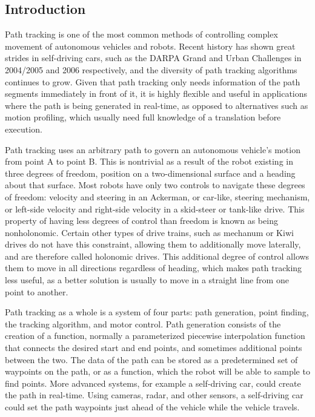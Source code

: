 \documentclass[mla7]{mla}
\begin{document}
\begin{paper}

\section{Introduction}

Path tracking is one of the most common methods of controlling complex movement of autonomous vehicles and robots. Recent history has shown great strides in self-driving cars, such as the DARPA Grand and Urban Challenges in 2004/2005 and 2006 respectively, and the diversity of path tracking algorithms continues to grow. Given that path tracking only needs information of the path segments immediately in front of it, it is highly flexible and useful in applications where the path is being generated in real-time, as opposed to alternatives such as motion profiling, which usually need full knowledge of a translation before execution.

Path tracking uses an arbitrary path to govern an autonomous vehicle's motion from point A to point B. This is nontrivial as a result of the robot existing in three degrees of freedom, position on a two-dimensional surface and a heading about that surface. Most robots have only two controls to navigate these degrees of freedom: velocity and steering in an Ackerman, or car-like, steering mechanism, or left-side velocity and right-side velocity in a skid-steer or tank-like drive. This property of having less degrees of control than freedom is known as being nonholonomic. Certain other types of drive trains, such as mechanum or Kiwi drives do not have this constraint, allowing them to additionally move laterally, and are therefore called holonomic drives. This additional degree of control allows them to move in all directions regardless of heading, which makes path tracking less useful, as a better solution is usually to move in a straight line from one point to another.

Path tracking as a whole is a system of four parts: path generation, point finding, the tracking algorithm, and motor control. Path generation consists of the creation of a function, normally a parameterized piecewise interpolation function that connects the desired start and end points, and sometimes additional points between the two. The data of the path can be stored as a predetermined set of waypoints on the path, or as a function, which the robot will be able to sample to find points. More advanced systems, for example a self-driving car, could create the path in real-time. Using cameras, radar, and other sensors, a self-driving car could set the path waypoints just ahead of the vehicle while the vehicle travels.


\end{paper}
\end{document}
